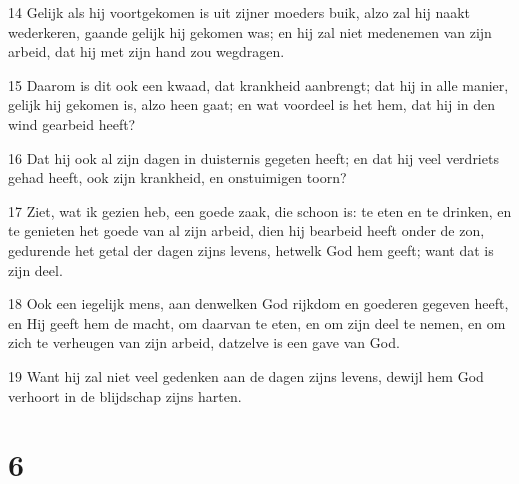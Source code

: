 \par 14 Gelijk als hij voortgekomen is uit zijner moeders buik, alzo zal hij naakt wederkeren, gaande gelijk hij gekomen was; en hij zal niet medenemen van zijn arbeid, dat hij met zijn hand zou wegdragen.
\par 15 Daarom is dit ook een kwaad, dat krankheid aanbrengt; dat hij in alle manier, gelijk hij gekomen is, alzo heen gaat; en wat voordeel is het hem, dat hij in den wind gearbeid heeft?
\par 16 Dat hij ook al zijn dagen in duisternis gegeten heeft; en dat hij veel verdriets gehad heeft, ook zijn krankheid, en onstuimigen toorn?
\par 17 Ziet, wat ik gezien heb, een goede zaak, die schoon is: te eten en te drinken, en te genieten het goede van al zijn arbeid, dien hij bearbeid heeft onder de zon, gedurende het getal der dagen zijns levens, hetwelk God hem geeft; want dat is zijn deel.
\par 18 Ook een iegelijk mens, aan denwelken God rijkdom en goederen gegeven heeft, en Hij geeft hem de macht, om daarvan te eten, en om zijn deel te nemen, en om zich te verheugen van zijn arbeid, datzelve is een gave van God.
\par 19 Want hij zal niet veel gedenken aan de dagen zijns levens, dewijl hem God verhoort in de blijdschap zijns harten.

\chapter{6}

